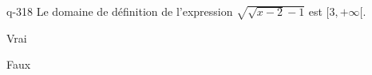 \begin{truefalse}{q-318}
Le domaine de définition de l'expression $\sqrt{\sqrt{x-2}-1}$ est $[3,+\infty[$.
\item* Vrai
\item Faux
\end{truefalse}

